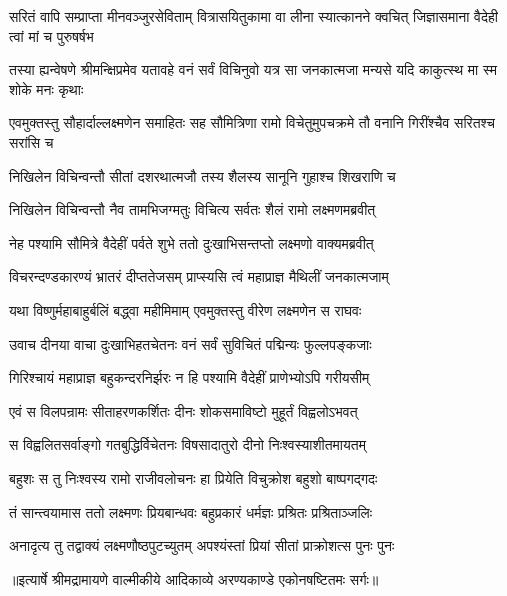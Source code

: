 \threelineshloka
{सरितं वापि सम्प्राप्ता मीनवञ्जुरसेविताम्}
{वित्रासयितुकामा वा लीना स्यात्कानने क्वचित्}
{जिज्ञासमाना वैदेही त्वां मां च पुरुषर्षभ} %

\threelineshloka
{तस्या ह्यन्वेषणे श्रीमन्क्षिप्रमेव यतावहे}
{वनं सर्वं विचिनुवो यत्र सा जनकात्मजा}
{मन्यसे यदि काकुत्स्थ मा स्म शोके मनः कृथाः} %

\threelineshloka
{एवमुक्तस्तु सौहार्दाल्लक्ष्मणेन समाहितः}
{सह सौमित्रिणा रामो विचेतुमुपचक्रमे}
{तौ वनानि गिरींश्चैव सरितश्च सरांसि च} %

\twolineshloka
{निखिलेन विचिन्वन्तौ सीतां दशरथात्मजौ}
{तस्य शैलस्य सानूनि गुहाश्च शिखराणि च} %

\twolineshloka
{निखिलेन विचिन्वन्तौ नैव तामभिजग्मतुः}
{विचित्य सर्वतः शैलं रामो लक्ष्मणमब्रवीत्} %

\twolineshloka
{नेह पश्यामि सौमित्रे वैदेहीं पर्वते शुभे}
{ततो दुःखाभिसन्तप्तो लक्ष्मणो वाक्यमब्रवीत्} %

\twolineshloka
{विचरन्दण्डकारण्यं भ्रातरं दीप्ततेजसम्}
{प्राप्स्यसि त्वं महाप्राज्ञ मैथिलीं जनकात्मजाम्} %

\twolineshloka
{यथा विष्णुर्महाबाहुर्बलिं बद्ध्वा महीमिमाम्}
{एवमुक्तस्तु वीरेण लक्ष्मणेन स राघवः} %

\twolineshloka
{उवाच दीनया वाचा दुःखाभिहतचेतनः}
{वनं सर्वं सुविचितं पद्मिन्यः फुल्लपङ्कजाः} %

\twolineshloka
{गिरिश्चायं महाप्राज्ञ बहुकन्दरनिर्झरः}
{न हि पश्यामि वैदेहीं प्राणेभ्योऽपि गरीयसीम्} %

\twolineshloka
{एवं स विलपन्रामः सीताहरणकर्शितः}
{दीनः शोकसमाविष्टो मुहूर्तं विह्वलोऽभवत्} %

\twolineshloka
{स विह्वलितसर्वाङ्गो गतबुद्धिर्विचेतनः}
{विषसादातुरो दीनो निःश्वस्याशीतमायतम्} %

\twolineshloka
{बहुशः स तु निःश्वस्य रामो राजीवलोचनः}
{हा प्रियेति विचुक्रोश बहुशो बाष्पगद्गदः} %

\twolineshloka
{तं सान्त्वयामास ततो लक्ष्मणः प्रियबान्धवः}
{बहुप्रकारं धर्मज्ञः प्रश्रितः प्रश्रिताञ्जलिः} %

\twolineshloka
{अनादृत्य तु तद्वाक्यं लक्ष्मणौष्ठपुटच्युतम्}
{अपश्यंस्तां प्रियां सीतां प्राक्रोशत्स पुनः पुनः} %


{॥इत्यार्षे श्रीमद्रामायणे वाल्मीकीये आदिकाव्ये अरण्यकाण्डे एकोनषष्टितमः सर्गः॥}


